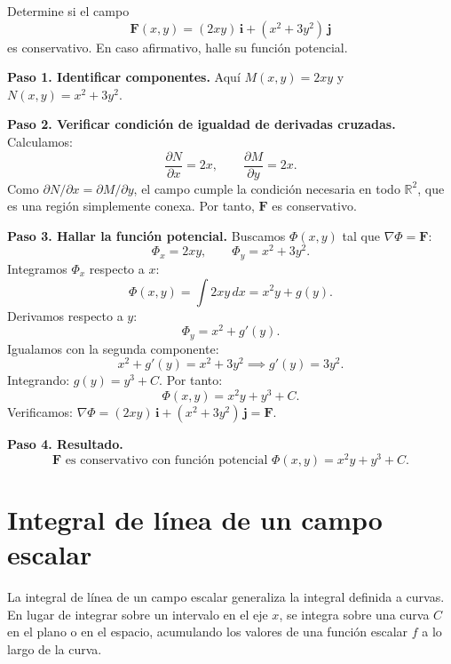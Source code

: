 \begin{example}
Determine si el campo
\[
\mathbf{F}(x,y) = (2x y)\,\mathbf{i} + (x^2 + 3y^2)\,\mathbf{j}
\]
es conservativo. En caso afirmativo, halle su función potencial.
\begin{myproof}
\textbf{Paso 1. Identificar componentes.}
Aquí \(M(x,y) = 2xy\) y \(N(x,y) = x^2 + 3y^2\).

\textbf{Paso 2. Verificar condición de igualdad de derivadas cruzadas.}
Calculamos:
\[
\frac{\partial N}{\partial x} = 2x, \qquad
\frac{\partial M}{\partial y} = 2x.
\]
Como \(\partial N/\partial x = \partial M/\partial y\), el campo
cumple la condición necesaria en todo \(\mathbb{R}^2\), que es una
región simplemente conexa. Por tanto, \(\mathbf{F}\) es conservativo.

\textbf{Paso 3. Hallar la función potencial.}
Buscamos \(\Phi(x,y)\) tal que \(\nabla \Phi = \mathbf{F}\):
\[
\Phi_x = 2xy, \qquad \Phi_y = x^2 + 3y^2.
\]
Integramos \(\Phi_x\) respecto a \(x\):
\[
\Phi(x,y) = \int 2xy \, dx = x^2 y + g(y).
\]
Derivamos respecto a \(y\):
\[
\Phi_y = x^2 + g'(y).
\]
Igualamos con la segunda componente:
\[
x^2 + g'(y) = x^2 + 3y^2 \implies g'(y) = 3y^2.
\]
Integrando: \(g(y) = y^3 + C\). Por tanto:
\[
\Phi(x,y) = x^2 y + y^3 + C.
\]
Verificamos: \(\nabla \Phi = (2xy)\,\mathbf{i} + (x^2+3y^2)\,\mathbf{j} = \mathbf{F}\).

\textbf{Paso 4. Resultado.}
\[
\boxed{\mathbf{F} \text{ es conservativo con función potencial } \Phi(x,y) = x^2 y + y^3 + C.}
\]
\end{myproof}
\end{example}

\section{Integral de línea de un campo escalar}

La integral de línea de un campo escalar generaliza la integral definida a curvas. En lugar de integrar sobre un intervalo en el eje \(x\), se integra sobre una curva \(C\) en el plano o en el espacio, acumulando los valores de una función escalar \(f\) a lo largo de la
curva.


